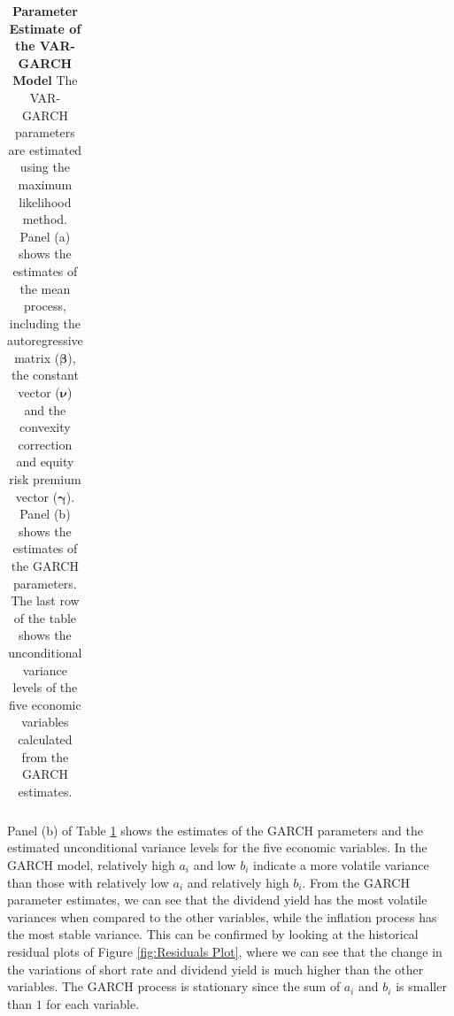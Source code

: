 \documentclass{sfuthesis}
\numberwithin{equation}{chapter}
\begin{document}
\begin{table}[!ht]
{\begin{tabular}{ccccccc}
					\bottomrule
				\end{tabular}
			}
			\caption[Parameter Estimate of the VAR-GARCH Model]{\textbf{Parameter Estimate of the VAR-GARCH Model}
				\vspace{-0.4cm}
				\newline\footnotesize\justify The VAR-GARCH parameters are estimated using the maximum likelihood method. Panel (a) shows the estimates of the mean process, including the autoregressive matrix ($\boldsymbol{\beta}$), the constant vector ($\boldsymbol{\nu}$) and the convexity correction and equity risk premium vector ($\boldsymbol{\gamma}$). Panel (b) shows the estimates of the GARCH parameters. The last row of the table shows the unconditional variance levels of the five economic variables calculated from the GARCH estimates.}
			\label{table:Parameter Estimate of the VAR-GARCH Model}
		\end{table}
	
	
		\justify
		Panel (b) of Table \ref{table:Parameter Estimate of the VAR-GARCH Model} shows the estimates of the GARCH parameters and the estimated unconditional variance levels for the five economic variables. In the GARCH model, relatively high $a_i$ and low $b_i$ indicate a more volatile variance than those with relatively low $a_i$ and relatively high $b_i$. From the GARCH parameter estimates, we can see that the dividend yield has the most volatile variances when compared to the other variables, while the inflation process has the most stable variance. This can be confirmed by looking at the historical residual plots of Figure \ref{fig:Residuals Plot}, where we can see that the change in the variations of short rate and dividend yield is much higher than the other variables. The GARCH process is stationary since the sum of $a_i$ and $b_i$ is smaller than $1$ for each variable.
		
\end{document}
